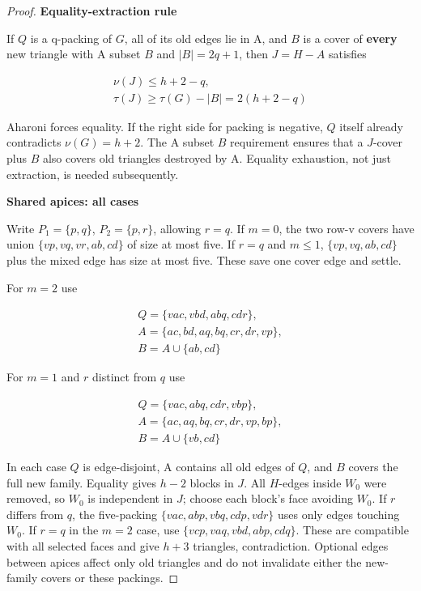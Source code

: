 \documentclass[11pt]{article}
\theoremstyle{definition}\newtheorem{definition}[theorem]{Definition}
\theoremstyle{remark}\newtheorem{remark}[theorem]{Remark}
\begin{document}
\begin{proof}
\par\medskip\noindent\textbf{Equality-extraction rule}\label{equality-extraction-rule}

If \(Q\) is a q-packing of \(G\), all of its old edges lie in A, and \(B\) is a cover of \textbf{every} new triangle with A subset \(B\) and \(|B|=2q+1\), then \(J=H-A\) satisfies

\begin{equation}
\begin{gathered}
\nu(J)\le h+2-q, \\
\tau(J)\ge \tau(G)-|B|=2(h+2-q)
\end{gathered}
\end{equation}

Aharoni forces equality. If the right side for packing is negative, \(Q\) itself already contradicts \(\nu(G)=h+2\). The A subset \(B\) requirement ensures that a \(J\)-cover plus \(B\) also covers old triangles destroyed by A. Equality exhaustion, not just extraction, is needed subsequently.

\par\medskip\noindent\textbf{Shared apices: all cases}\label{shared-apices-all-cases}

Write \(P_1=\{p,q\}\), \(P_2=\{p,r\}\), allowing \(r=q\). If \(m=0\), the two row-v covers have union \(\{vp,vq,vr,ab,cd\}\) of size at most five. If \(r=q\) and \(m\le 1\), \(\{vp,vq,ab,cd\}\) plus the mixed edge has size at most five. These save one cover edge and settle.

For \(m=2\) use

\begin{equation}
\begin{gathered}
Q = \{vac,vbd,abq,cdr\}, \\
A = \{ac,bd,aq,bq,cr,dr,vp\}, \\
B = A\cup \{ab,cd\}
\end{gathered}
\end{equation}

For \(m=1\) and \(r\) distinct from \(q\) use

\begin{equation}
\begin{gathered}
Q = \{vac,abq,cdr,vbp\}, \\
A = \{ac,aq,bq,cr,dr,vp,bp\}, \\
B = A\cup \{vb,cd\}
\end{gathered}
\end{equation}

In each case \(Q\) is edge-disjoint, A contains all old edges of \(Q\), and \(B\) covers the full new family. Equality gives \(h-2\) blocks in \(J\). All \(H\)-edges inside \(W_0\) were removed, so \(W_0\) is independent in \(J\); choose each block's face avoiding \(W_0\). If \(r\) differs from \(q\), the five-packing \(\{vac,abp,vbq,cdp,vdr\}\) uses only edges touching \(W_0\). If \(r=q\) in the \(m=2\) case, use \(\{vcp,vaq,vbd,abp,cdq\}\). These are compatible with all selected faces and give \(h+3\) triangles, contradiction. Optional edges between apices affect only old triangles and do not invalidate either the new-family covers or these packings.


\end{proof}
\end{document}
